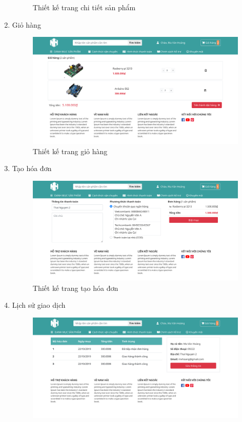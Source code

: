 \begin{enumerate}[label=\textbf{\alph*)}]
\begin{figure}[h!]
		      \caption{Thiết kế trang chi tiết sản phẩm}
	      \end{figure}
	      \newpage
	\item Giỏ hàng
	      \begin{figure}[h!]
		      \centering
		      \includegraphics[width=\linewidth]{fig/r_cart.png}
		      \caption{Thiết kế trang giỏ hàng}
	      \end{figure}
	\item Tạo hóa đơn
	      \begin{figure}[h!]
		      \centering
		      \includegraphics[width=\linewidth]{fig/r_make_order.png}
		      \caption{Thiết kế trang tạo hóa đơn}
	      \end{figure}
	      \newpage
	\item Lịch sử giao dịch
	      \begin{figure}[h!]
		      \centering
		      \includegraphics[width=\linewidth]{fig/r_user1.png}

\end{figure}
\end{enumerate}
